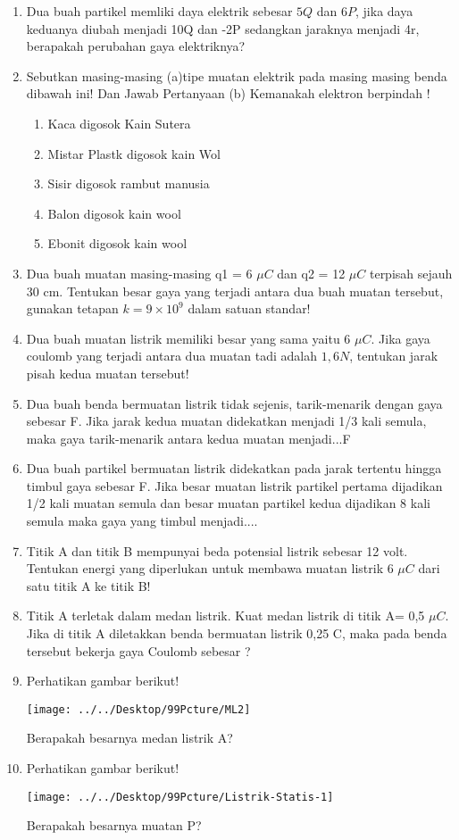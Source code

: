 \documentclass[12pt,a4paper,draft,final,oneside,twoside,openright,openany]{article}
\begin{document}
	\begin{enumerate}
		\item Dua buah partikel memliki daya elektrik sebesar $5Q$ dan $6P$, jika daya keduanya diubah menjadi 10Q dan -2P sedangkan jaraknya menjadi 4r, berapakah perubahan gaya elektriknya?
		\item Sebutkan masing-masing (a)tipe muatan elektrik pada masing masing benda dibawah ini! Dan Jawab Pertanyaan (b) Kemanakah elektron berpindah !
		\begin{enumerate}
			\item Kaca digosok Kain Sutera
			\item Mistar Plastk digosok kain Wol
			\item Sisir digosok rambut manusia
			\item Balon digosok kain wool
			\item Ebonit digosok kain wool
		\end{enumerate}
		\item Dua buah muatan masing-masing q1 = 6 $\mu C$ dan q2 = 12 $\mu C$ terpisah sejauh 30 cm. Tentukan besar gaya yang terjadi antara dua buah muatan tersebut, gunakan tetapan $k = 9 \times 10^9$ dalam satuan standar!
		\item Dua buah muatan listrik memiliki besar yang sama yaitu 6 $\mu C$. Jika gaya coulomb yang terjadi antara dua muatan tadi adalah  $1,6 N$, tentukan jarak pisah kedua muatan tersebut!
		\item Dua buah benda bermuatan listrik tidak sejenis, tarik-menarik dengan gaya sebesar F. Jika jarak kedua muatan didekatkan menjadi 1/3 kali semula, maka gaya tarik-menarik antara kedua muatan menjadi...F
		\item Dua buah partikel bermuatan listrik didekatkan pada jarak tertentu hingga timbul gaya sebesar F. Jika besar muatan listrik partikel pertama dijadikan 1/2 kali muatan semula dan besar muatan partikel kedua dijadikan 8 kali semula maka gaya yang timbul menjadi....
		\item  Titik A dan titik B mempunyai beda potensial listrik sebesar 12 volt. Tentukan energi yang diperlukan untuk membawa muatan listrik 6 $\mu C$ dari satu titik A ke titik B!
		\item Titik A terletak dalam medan listrik. Kuat medan listrik di titik A= 0,5 $\mu C$. Jika di titik A diletakkan benda bermuatan listrik 0,25 C, maka pada benda tersebut bekerja gaya Coulomb sebesar ?
		\item Perhatikan gambar berikut!
			\begin{center}
				\texttt{[image: ../../Desktop/99Pcture/ML2]}
			\end{center}
		Berapakah besarnya medan listrik A?
		\item Perhatikan gambar berikut!
		\begin{center}
		\texttt{[image: ../../Desktop/99Pcture/Listrik-Statis-1]}
		\end{center}
		Berapakah besarnya muatan P?
	\end{enumerate}
\end{document}
